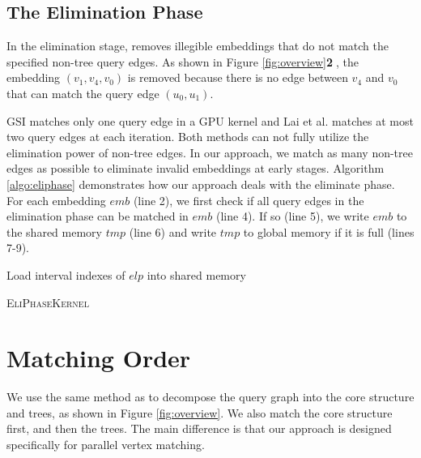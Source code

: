 \subsection{The Elimination Phase\label{sec:eliphase}}
In the elimination stage, \SystemName removes illegible embeddings that do not match the specified non-tree query edges. As shown in Figure \ref{fig:overview}\textbf{\textcircled{2}}, the embedding $(v_1, v_4, v_0)$ is removed because there is no edge between $v_4$ and $v_0$ that can match the query edge $(u_0, u_1)$.

GSI \cite{zeng2020gsi} matches only one query edge in a GPU kernel and Lai et al. \cite{lai2015scalable} matches at most two query edges at
each iteration. Both methods can not fully utilize the elimination power of non-tree edges. In our approach, we match as many non-tree
edges as possible to eliminate invalid embeddings at early stages. Algorithm \ref{algo:eliphase} demonstrates how our approach deals with
the eliminate phase. For each embedding $emb$ (line 2), we first check if all query edges in the elimination phase can be matched in $emb$
(line 4). If so (line 5), we write $emb$ to the shared memory $tmp$ (line 6) and write $tmp$ to global memory if it is full (lines 7-9).


\begin{algorithm}[t!]
Load interval indexes of $elp$ into shared memory\;
\caption{\textsc{EliPhaseKernel}}
\label{algo:eliphase}
\end{algorithm}



\section{Matching Order\label{sec:matchingorder}}
We use the same method as \cite{bi2016efficient} to decompose the query graph into the core structure and trees, as shown in Figure \ref{fig:overview}. We also match the core structure first, and then the trees. The main difference is that our approach is designed specifically for parallel vertex matching.

